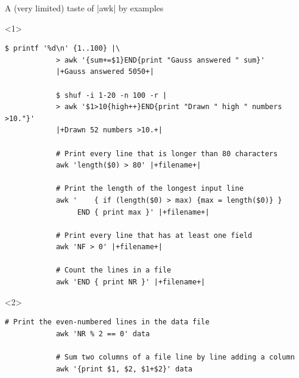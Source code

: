 \begin{frame}[fragile]{A (very limited) taste of \bash|awk| by examples}
    \begin{onlyenv}<1>
        \begin{lstlisting}[style=MyBash, numbers=none, xleftmargin=3mm, xrightmargin=3mm]
            $ printf '%d\n' {1..100} |\
            > awk '{sum+=$1}END{print "Gauss answered " sum}'
            |+Gauss answered 5050+|

            $ shuf -i 1-20 -n 100 -r |
            > awk '$1>10{high++}END{print "Drawn " high " numbers >10."}'
            |+Drawn 52 numbers >10.+|

            # Print every line that is longer than 80 characters
            awk 'length($0) > 80' |+filename+|

            # Print the length of the longest input line
            awk '    { if (length($0) > max) {max = length($0)} }
                 END { print max }' |+filename+|

            # Print every line that has at least one field
            awk 'NF > 0' |+filename+|

            # Count the lines in a file
            awk 'END { print NR }' |+filename+|
        \end{lstlisting}
    \end{onlyenv}
    \begin{onlyenv}<2>
        \begin{lstlisting}[style=MyBash, numbers=none, xleftmargin=3mm, xrightmargin=3mm, belowskip=-3mm]
            # Print the even-numbered lines in the data file
            awk 'NR % 2 == 0' data

            # Sum two columns of a file line by line adding a column
            awk '{print $1, $2, $1+$2}' data


\end{lstlisting}
\end{onlyenv}
\end{frame}
